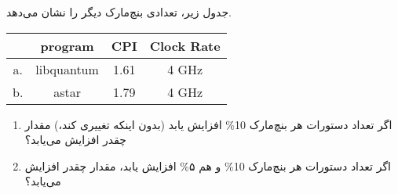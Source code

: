 \documentclass[11pt]{article}
\newcommand{\cpi}{\lr{CPI} }
\begin{document}
جدول زیر، تعدادی بنچ‌مارک دیگر را نشان می‌دهد.

\begin{table}[H]
    \begin{latin}
        \begin{center}
            \begin{tabular}{|c|c|c|c|}
                \hline
                & program & CPI & Clock Rate \\
                \hline
                \hline
                a. & libquantum & 1.61 & 4 GHz \\
                \hline
                b. & astar & 1.79 & 4 GHz \\
                \hline
            \end{tabular}
        \end{center}
    \end{latin}
\end{table}

\begin{enumerate}
    \item 
    اگر تعداد دستورات هر بنچ‌مارک 10\% افزایش یابد (بدون اینکه \cpi تغییری کند،) مقدار  چقدر افزایش می‌یابد؟
    \item
      اگر تعداد دستورات هر بنچ‌مارک 10\% و \cpi هم ۵\% افزایش یابد، مقدار  چقدر افزایش می‌یابد؟
    
\end{enumerate}
\end{document}
